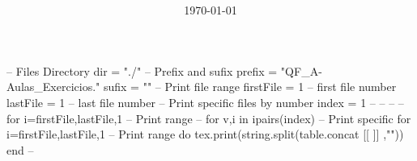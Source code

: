 \documentclass[
    class=article,
    multi={minipage},
    border={3mm},
]{standalone}
\title{\huge\bfseries\color{Emph}\mytitle}
\author{\Large\myauthor}
\date{\Large\today}
\begin{document}
\mymaketitle
\begin{luacode*}
    -- Files Directory
    dir = "./"
    -- Prefix and sufix
    prefix = "QF_A-Aulas_Exercicios."
    sufix  = ""
    -- Print file range
    firstFile = 1 -- first file number
    lastFile  = 1 -- last  file number
    -- Print specific files by number
    index = {1}
    -- %
    -- %
    -- %
    -- for i=firstFile,lastFile,1 -- Print range
    -- for v,i in ipairs(index)   -- Print specific
    for i=firstFile,lastFile,1 -- Print range
    do
        tex.print(string.split(table.concat{
        [[
            \newpage
        ]]
        },"\n"))
    end
    -- %
\end{luacode*}
\end{document}

